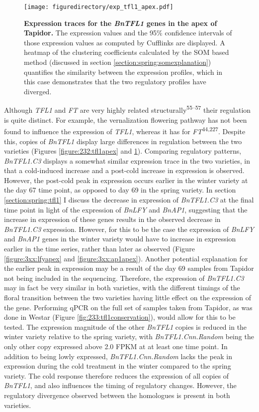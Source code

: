 \documentclass[12pt,]{book}
\begin{document}
\begin{figure}[htbp]
\centering
\texttt{[image: figuredirectory/exp\_tfl1\_apex.pdf]}
\caption{\textbf{Expression traces for the \emph{BnTFL1} genes in the
apex of Tapidor.} The expression values and the 95\% confidence
intervals of those expression values as computed by Cufflinks are
displayed. A heatmap of the clustering coefficients calculated by the
SOM based method (discussed in section
\ref{section:spring:somexplanation}) quantifies the similarity between
the expression profiles, which in this case demonstrates that the two
regulatory profiles have diverged.}\label{figure:3xx:tfl1apex}
\end{figure}

Although \emph{TFL1} and \emph{FT} are very highly related
structurally\textsuperscript{55--57} their regulation is quite distinct.
For example, the vernalization flowering pathway has not been found to
influence the expression of \emph{TFL1}, whereas it has for
\emph{FT}\textsuperscript{44,227}. Despite this, copies of \emph{BnTFL1}
display large differences in regulation between the two varieties
(Figures \ref{figure:232:tfl1apex} and \ref{figure:3xx:tfl1apex}).
Comparing regulatory patterns, \emph{BnTFL1.C3} displays a somewhat
similar expression trace in the two varieties, in that a cold-induced
increase and a post-cold increase in expression is observed. However,
the post-cold peak in expression occurs earlier in the winter variety at
the day 67 time point, as opposed to day 69 in the spring variety. In
section \ref{section:spring:tfl1} I discuss the decrease in expression
of \emph{BnTFL1.C3} at the final time point in light of the expression
of \emph{BnLFY} and \emph{BnAP1}, suggesting that the increase in
expression of these genes results in the observed decrease in
\emph{BnTFL1.C3} expression. However, for this to be the case the
expression of \emph{BnLFY} and \emph{BnAP1} genes in the winter variety
would have to increase in expression earlier in the time series, rather
than later as observed (Figure \ref{figure:3xx:lfyapex} and
\ref{figure:3xx:ap1apex}). Another potential explanation for the earlier
peak in expression may be a result of the day 69 samples from Tapidor
not being included in the sequencing. Therefore, the expression of
\emph{BnTFL1.C3} may in fact be very similar in both varieties, with the
different timings of the floral transition between the two varieties
having little effect on the expression of the gene. Performing qPCR on
the full set of samples taken from Tapidor, as was done in Westar
(Figure \ref{fig:233:tfl1conservation}), would allow for this to be
tested. The expression magnitude of the other \emph{BnTFL1} copies is
reduced in the winter variety relative to the spring variety, with
\emph{BnTFL1.Cnn.Random} being the only other copy expressed above 2.0
FPKM at at least one time point. In addition to being lowly expressed,
\emph{BnTFL1.Cnn.Random} lacks the peak in expression during the cold
treatment in the winter compared to the spring variety. The cold
response therefore reduces the expression of all copies of
\emph{BnTFL1}, and also influences the timing of regulatory changes.
However, the regulatory divergence observed between the homologues is
present in both varieties.
\end{document}
